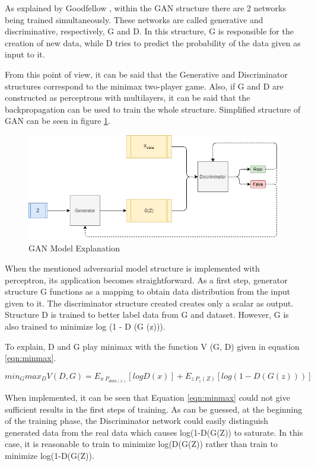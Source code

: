 As explained by Goodfellow \cite{gan}, within the GAN structure there are 2 networks being trained simultaneously. These networks are called generative and discriminative, respectively, G and D. In this structure, G is responsible for the creation of new data, while D tries to predict the probability of the data given as input to it.

From this point of view, it can be said that the Generative and Discriminator structures correspond to the minimax two-player game. Also, if G and D are constructed as perceptrons with multilayers, it can be said that the backpropagation can be used to train the whole structure. Simplified structure of GAN can be seen in figure \ref{fig:ganstruct}.

\begin{figure}[h!]
    \centering
    \includegraphics[scale=0.55]{figures/chapter3/GAN.png}
    \vspace*{3mm}
    \caption{GAN Model Explanation}
    \label{fig:ganstruct}
\end{figure}

When the mentioned adversarial model structure is implemented with perceptron, its application becomes straightforward. As a first step, generator structure G functions as a mapping to obtain data distribution from the input given to it. The discriminator structure created creates only a scalar as output. Structure D is trained to better label data from G and dataset. However, G is also trained to minimize log (1 - D (G (z))).

To explain, D and G play minimax with the function V (G, D) given in equation \ref{eqn:minmax}.

\begin{equation}
\label{eqn:minmax}
    min_Gmax_D V(D,G)= E_{x~P_{data(x)}}[logD(x)]+E_{z~P_{z}(Z)}[log(1-D(G(z)))]
\end{equation}

When implemented, it can be seen that Equation \ref{eqn:minmax} could not give sufficient results in the first steps of training. As can be guessed, at the beginning of the training phase, the Discriminator network could easily distinguish generated data from the real data which causes log(1-D(G(Z)) to saturate. In this case, it is reasonable to train to minimize log(D(G(Z)) rather than train to minimize log(1-D(G(Z)).

